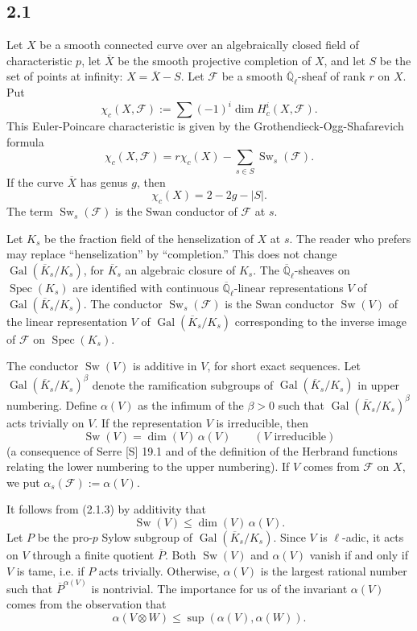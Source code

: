 \documentclass[10pt]{article}
\newcommand{\Ql}{\overline{\mathbb Q}_{\ell}}
\newcommand{\Spec}{\operatorname{Spec}}
\newcommand{\Gal}{\operatorname{Gal}}
\newcommand{\Sw}{\operatorname{Sw}}
\begin{document}
\subsection*{2.1}
Let $X$ be a smooth connected curve over an algebraically closed field of characteristic $p$, let $\overline X$ be the smooth projective completion of $X$, and let $S$ be the set of points at infinity: $X=\overline X-S$.
Let $\mathcal F$ be a smooth $\Ql$-sheaf of rank $r$ on $X$.
Put
\[
 \chi_c(X,\mathcal F):=\sum (-1)^i\dim H^i_c(X,\mathcal F).
\]
This Euler-Poincare characteristic is given by the Grothendieck-Ogg-Shafarevich formula
\begin{equation}
 \chi_c(X,\mathcal F)=r\chi_c(X)-\sum_{s\in S}\Sw_s(\mathcal F).
\tag{2.1.1}
\end{equation}
If the curve $\overline X$ has genus $g$, then
\begin{equation}
 \chi_c(X)=2-2g-|S|.
\tag{2.1.2}
\end{equation}
The term $\Sw_s(\mathcal F)$ is the Swan conductor of $\mathcal F$ at $s$.

Let $K_s$ be the fraction field of the henselization of $X$ at $s$.
The reader who prefers may replace ``henselization'' by ``completion.''
This does not change $\Gal(\overline K_s/K_s)$, for $\overline K_s$ an algebraic closure of $K_s$.
The $\Ql$-sheaves on $\Spec(K_s)$ are identified with continuous $\Ql$-linear representations $V$ of $\Gal(\overline K_s/K_s)$.
The conductor $\Sw_s(\mathcal F)$ is the Swan conductor $\Sw(V)$ of the linear representation $V$ of $\Gal(\overline K_s/K_s)$ corresponding to the inverse image of $\mathcal F$ on $\Spec(K_s)$.

The conductor $\Sw(V)$ is additive in $V$, for short exact sequences.
Let $\Gal(\overline K_s/K_s)^\beta$ denote the ramification subgroups of $\Gal(\overline K_s/K_s)$ in upper numbering.
Define $\alpha(V)$ as the infimum of the $\beta>0$ such that $\Gal(\overline K_s/K_s)^\beta$ acts trivially on $V$.
If the representation $V$ is irreducible, then
\begin{equation}
 \Sw(V)=\dim(V)\,\alpha(V)\qquad (V\text{ irreducible})
\tag{2.1.3}
\end{equation}
(a consequence of Serre [S] 19.1 and of the definition of the Herbrand functions relating the lower numbering to the upper numbering).
If $V$ comes from $\mathcal F$ on $X$, we put $\alpha_s(\mathcal F):=\alpha(V)$.

It follows from (2.1.3) by additivity that
\begin{equation}
 \Sw(V)\le \dim(V)\,\alpha(V).
\tag{2.1.4}
\end{equation}
Let $P$ be the pro-$p$ Sylow subgroup of $\Gal(\overline K_s/K_s)$.
Since $V$ is $\ell$-adic, it acts on $V$ through a finite quotient $\overline P$.
Both $\Sw(V)$ and $\alpha(V)$ vanish if and only if $V$ is tame, i.e. if $P$ acts trivially.
Otherwise, $\alpha(V)$ is the largest rational number such that $\overline P^{\alpha(V)}$ is nontrivial.
The importance for us of the invariant $\alpha(V)$ comes from the observation that
\begin{equation}
 \alpha(V\otimes W)\le \sup(\alpha(V),\alpha(W)).
\tag{2.1.5}
\end{equation}
\end{document}
